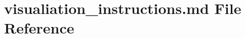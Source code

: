 \hypertarget{visualiation__instructions_8md}{}\section{visualiation\+\_\+instructions.\+md File Reference}
\label{visualiation__instructions_8md}

